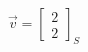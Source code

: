 \documentclass[preview]{standalone}
\begin{document}
\begin{align*}
\vec{v} = \begin{bmatrix} 2 \\ 2 \end{bmatrix}_S
\end{align*}
\end{document}
